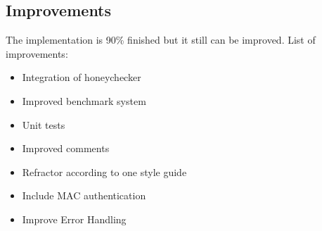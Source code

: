 \documentclass[../main.tex]{subfiles}
\begin{document}
\subsection{Improvements}
The implementation is 90\% finished but it still can be improved. 
List of improvements:
\begin{itemize}
	\item Integration of honeychecker
	\item Improved benchmark system
	\item Unit tests
	\item Improved comments
	\item Refractor according to one style guide
	\item Include MAC authentication
	\item Improve Error Handling
\end{itemize}
\end{document}
